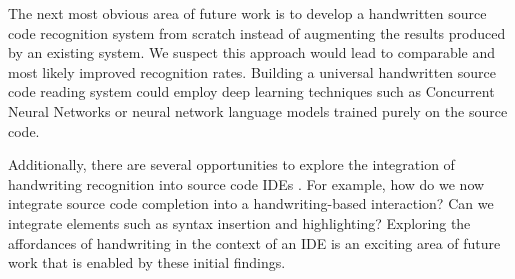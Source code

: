 \documentclass{vgtc}                          %
\begin{document}









The next most obvious area of future work is to develop a handwritten source code recognition system from scratch instead of augmenting the results produced by an existing system.  We suspect this approach would lead to comparable and most likely improved recognition rates. Building a universal handwritten source code reading system could employ deep learning techniques such as Concurrent Neural Networks \cite{poznanski2016cnn} or neural network language models \cite{zamora2014neural} trained purely on the source code. 

Additionally, there are several opportunities to explore the integration of handwriting recognition into source code IDEs \cite{frye2008pdp}.  For example, how do we now integrate source code completion into a handwriting-based interaction?   Can we integrate elements such as syntax insertion and highlighting?  Exploring the affordances of handwriting in the context of an IDE is an exciting area of future work that is enabled by these initial findings.
\end{document}
